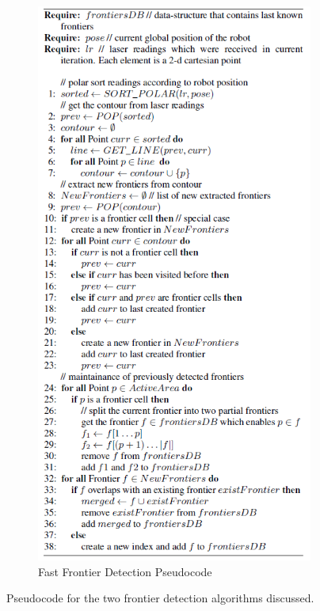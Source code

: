 \documentclass[a4paper,12pt]{article}
\begin{document}
\begin{figure}[H]
\begin{subfigure}{.5\textwidth}
						\includegraphics[width=.9\linewidth]{images/ffdPseudocode.png}
						\caption{Fast Frontier Detection Pseudocode}
						\label{ffdPseudocode}
					\end{subfigure}
					\caption{Pseudocode for the two frontier detection algorithms discussed. \cite{topiwala2018frontier, keidar2011fast,keidar2012robot}}
					\label{frontierSearchPseudocode}
				\end{figure}
\end{document}
